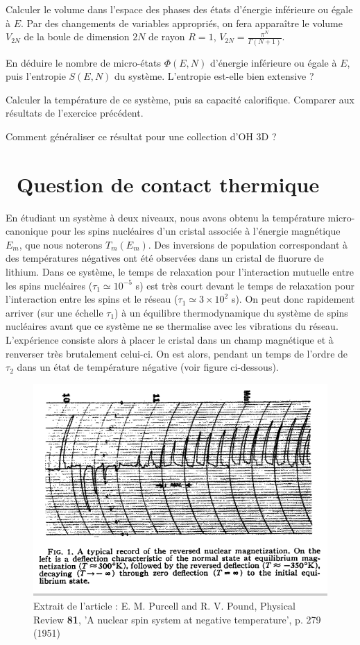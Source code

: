 \documentclass[utf8, 11pt]{feuille}
\begin{document}
\question
Calculer le volume dans l'espace des phases des états d'énergie inférieure ou égale à $E$. Par des changements de variables appropriés, on fera apparaître le volume $V_{2N}$ de la boule de dimension $2N$ de rayon $R=1$, $V_{2N}=\frac{\pi^N}{\Gamma(N+1)}$.

\question
En déduire le nombre de micro-états $\Phi(E,N)$ d'énergie inférieure ou égale à $E$, puis l'entropie $S(E,N)$ du système. L'entropie est-elle bien extensive ?

\question
Calculer la température de ce système, puis sa capacité calorifique. Comparer aux résultats de l'exercice précédent.

\question
Comment généraliser ce résultat pour une collection d'OH 3D ?



\section{\hard~Question de contact thermique}
En étudiant un système à deux niveaux, nous avons obtenu la température micro-canonique pour les spins nucléaires d'un cristal associée à l'énergie magnétique $E_m$, que nous noterons $T_m(E_m)$. Des inversions de population correspondant à des températures négatives ont été observées dans un cristal de fluorure de lithium. Dans ce système, le temps de relaxation pour l'interaction mutuelle entre les spins nucléaires ($\tau_1 \simeq 10^{-5}$ s) est très court devant le temps de relaxation pour l'interaction entre les spins et le réseau ($\tau_1 \simeq 3 \times 10^{2}$ s). On peut donc rapidement arriver (sur une échelle $\tau_1$) \`a un équilibre thermodynamique du système de spins nucléaires avant que ce système ne se thermalise avec les vibrations du réseau. L'expérience consiste alors à placer le cristal dans un champ magnétique et à renverser très brutalement celui-ci. On est alors, pendant un temps de l'ordre de $\tau_2$ dans un état de température négative (voir figure ci-dessous).

\begin{figure}[!t]
\centering
\includegraphics[height=.42 \textwidth]{negative}
\caption{Extrait de l'article : E. M. Purcell and R. V. Pound, Physical Review \textbf{81}, 'A nuclear spin system at negative temperature', p. 279 (1951)}
\label{FTN}
\end{figure}
\end{document}
